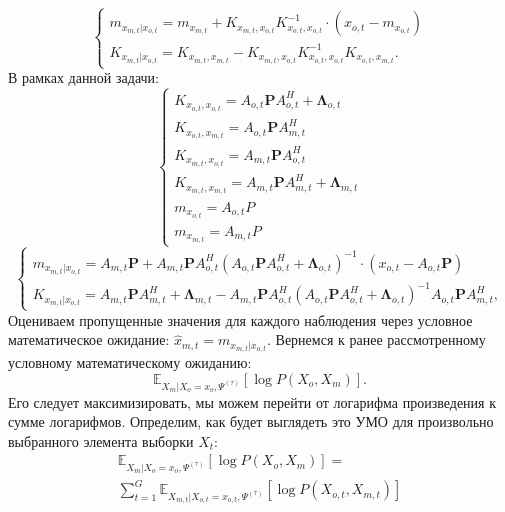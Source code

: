 \documentclass[11pt]{article}
\newcommand{\Expect}{\mathbb{E}}
\begin{document}
\begin{equation}
\left\{ \begin{gathered} 
m_{x_{m,t}|x_{o,t}} = m_{x_{m,t}} + K_{x_{m,t},x_{o,t}}K_{x_{o,t},x_{o,t}}^{-1}\cdot(x_{o,t}-m_{x_{o,t}}) \\
K_{x_{m,t}|x_{o,t}} = K_{x_{m,t},x_{m,t}}-K_{x_{m,t},x_{o,t}}K_{x_{o,t},x_{o,t}}^{-1}K_{x_{o,t},x_{m,t}}.
\end{gathered} \right.
\end{equation}
В рамках данной задачи:
\begin{equation}
\left\{ \begin{gathered} 
K_{x_{o,t},x_{o,t}} = A_{o,t}\mathbf{P} A_{o,t}^H +\mathbf{\Lambda}_{o,t} \\
K_{x_{o,t},x_{m,t}} = A_{o,t}\mathbf{P} A_{m,t}^H \\
K_{x_{m,t},x_{o,t}} = A_{m,t}\mathbf{P} A_{o,t}^H \\
K_{x_{m,t},x_{m,t}} = A_{m,t}\mathbf{P} A_{m,t}^H + \mathbf{\Lambda}_{m,t} \\
m_{x_{o,t}}=A_{o,t}P \\
m_{x_{m,t}}=A_{m,t}P
\end{gathered} \right.
\end{equation}
\begin{equation}
\left\{ \begin{gathered} 
m_{x_{m,t}|x_{o,t}} = A_{m,t}\mathbf{P} + A_{m,t}\mathbf{P} A_{o,t}^H(A_{o,t}\mathbf{P} A_{o,t}^H + \mathbf{\Lambda}_{o,t})^{-1}\cdot(x_{o,t}-A_{o,t}\mathbf{P}) \\
K_{x_{m,t}|x_{o,t}} = A_{m,t}\mathbf{P} A_{m,t}^H + \mathbf{\Lambda}_{m,t}-A_{m,t}\mathbf{P} A_{o,t}^H(A_{o,t}\mathbf{P} A_{o,t}^H + \mathbf{\Lambda}_{o,t})^{-1}A_{o,t}\mathbf{P} A_{m,t}^H,
\end{gathered} \right.
\end{equation}
Оцениваем пропущенные значения для каждого наблюдения через условное математическое ожидание:
$\hat{x}_{m,t} = m_{x_{m,t}|x_{o,t}}$.
Вернемся к ранее рассмотренному условному математическому ожиданию:
\begin{equation*}
 \Expect_{X_m|X_o=x_o, \Psi^{(\tau)}}[\log P(X_o, X_m)].
\end{equation*}
Его следует максимизировать, мы можем перейти от логарифма произведения к сумме логарифмов. Определим, как будет выглядеть это УМО для произвольно выбранного элемента выборки $X_t$:
\begin{equation*}
\begin{gathered}
 \Expect_{X_m|X_o=x_o, \Psi^{(\tau)}}[\log P(X_o, X_m)] = \\
 \sum_{t=1}^G\Expect_{X_{m,t}|X_{o,t}=x_{o,t}, \Psi^{(\tau)}}[\log P(X_{o,t}, X_{m,t})]
\end{gathered}
\end{equation*}
\end{document}
